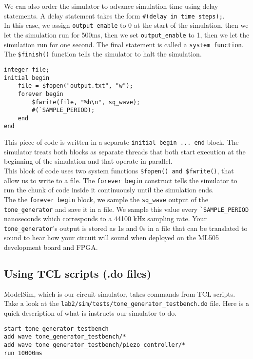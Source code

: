 \documentclass[11pt]{article}
\begin{document}
We can also order the simulator to advance simulation time using delay statements. A delay statement takes the form \verb|#(delay in time steps);|.\\

In this case, we assign \verb|output_enable| to 0 at the start of the simulation, then we let the simulation run for 500ms, then we set \verb|output_enable| to 1, then we let the simulation run for one second. The final statement is called a \verb|system function|. The \verb|$finish()| function tells the simulator to halt the simulation.

\begin{verbatim}
integer file;
initial begin
	file = $fopen("output.txt", "w");
	forever begin
		$fwrite(file, "%h\n", sq_wave);
		#(`SAMPLE_PERIOD);
	end
end
\end{verbatim}

This piece of code is written in a separate \verb|initial begin ... end| block. The simulator treats both blocks as separate threads that both start execution at the beginning of the simulation and that operate in parallel.\\

This block of code uses two system functions \verb|$fopen() and $fwrite()|, that allow us to write to a file. The \verb|forever begin| construct tells the simulator to run the chunk of code inside it continuously until the simulation ends.\\

The the \verb|forever begin| block, we sample the \verb|sq_wave| output of the \verb|tone_generator| and save it in a file. We sample this value every \verb|`SAMPLE_PERIOD| nanoseconds which corresponds to a 44100 kHz sampling rate. Your \verb|tone_generator|'s output is stored as 1s and 0s in a file that can be translated to sound to hear how your circuit will sound when deployed on the ML505 development board and FPGA.

\subsection{Using TCL scripts (.do files)}

ModelSim, which is our circuit simulator, takes commands from TCL scripts. Take a look at the \verb|lab2/sim/tests/tone_generator_testbench.do| file. Here is a quick description of what is instructs our simulator to do.

\begin{verbatim}
start tone_generator_testbench
add wave tone_generator_testbench/*
add wave tone_generator_testbench/piezo_controller/*
run 10000ms
\end{verbatim}
\end{document}
